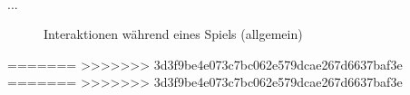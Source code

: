 ~\\
...

	\begin{figure}[ht]
	  \centering
	  
	  \caption{Interaktionen während eines Spiels (allgemein)}
	\end{figure}
=======
>>>>>>> 3d3f9be4e073c7bc062e579dcae267d6637baf3e
=======
>>>>>>> 3d3f9be4e073c7bc062e579dcae267d6637baf3e

%	  


